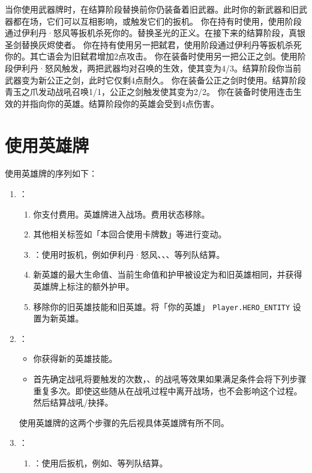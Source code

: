 当你使用武器牌时，在结算阶段替换前你仍装备着旧武器。此时你的新武器和旧武器都在场，它们可以互相影响，或触发它们的扳机。
\example 你在持有时使用，使用阶段通过伊利丹·怒风等扳机杀死你的。替换圣光的正义。在接下来的结算阶段，真银圣剑替换灰烬使者。
\example 你在持有使用另一把弑君，使用阶段通过伊利丹等扳机杀死你的。其亡语会为旧弑君增加2点攻击。
\example 你在装备时使用另一把公正之剑。使用阶段伊利丹·怒风触发，两把武器均对召唤的生效，使其变为4/3。结算阶段你当前武器变为新公正之剑，此时它仅剩4点耐久。
\example 你在装备公正之剑时使用。结算阶段青玉之爪发动战吼召唤1/1，公正之剑触发使其变为2/2。
\example 你在装备时使用连击生效的并指向你的英雄。结算阶段你的英雄会受到4点伤害。
​
\section{使用英雄牌}

使用英雄牌的序列如下：

\begin{enumerate}
    \item {}：
    \begin{enumerate}
        \item 你支付费用。英雄牌进入战场。费用状态移除。
        \item 其他相关标签如「本回合使用卡牌数」等进行变动。
        \item {}：使用时扳机，例如伊利丹·怒风、、、等列队结算。
        \item 新英雄的最大生命值、当前生命值和护甲被设定为和旧英雄相同，并获得英雄牌上标注的额外护甲。
        \item 移除你的旧英雄技能和旧英雄。将「你的英雄」 \texttt{Player.HERO\_ENTITY} 设置为新英雄。
    \end{enumerate}

    \item {}：
    \begin{itemize}
        \item 你获得新的英雄技能。
        \item 首先确定战吼将要触发的次数，、的战吼等效果如果满足条件会将下列步骤重复多次。即使这些随从在战吼过程中离开战场，也不会影响这个过程。然后结算战吼/抉择。
    \end{itemize}
    \notice 使用英雄牌的这两个步骤的先后视具体英雄牌有所不同。

    \item {}：
    \begin{enumerate}
        \item {}：使用后扳机，例如、等列队结算。
    \end{enumerate}
\end{enumerate}

